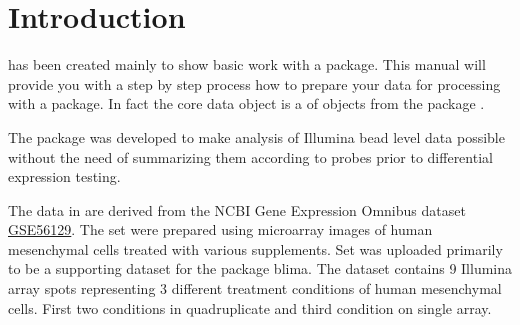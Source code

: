 \section{Introduction}
 has been created mainly to show basic work with a  package. This manual will provide you with a step by step process how to prepare your data for processing with a  package. In fact the core data object is a  of  objects from the package .

The package  was developed to make analysis of Illumina bead level data possible without the need of summarizing them according to probes prior to differential expression testing.

The data in  are derived from the  NCBI Gene Expression Omnibus dataset \href{http://www.ncbi.nlm.nih.gov/geo/query/acc.cgi?acc=GSE56129}{GSE56129}. The set were prepared using microarray images of human mesenchymal cells treated with various supplements. Set was uploaded primarily to be a supporting dataset for the package blima. The dataset contains 9 Illumina array spots representing 3 different treatment conditions of human mesenchymal cells. First two conditions in quadruplicate and third condition on single array.

